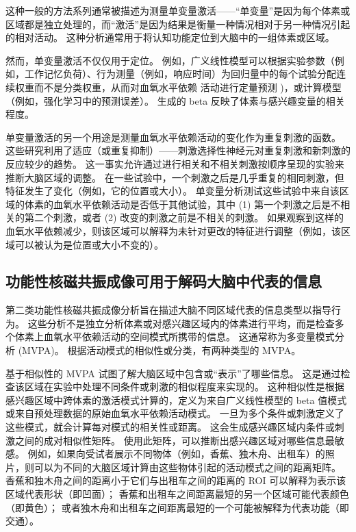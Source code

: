 这种一般的方法系列通常被描述为测量单变量激活——“单变量”是因为每个体素或区域都是独立处理的，而“激活”是因为结果是衡量一种情况相对于另一种情况引起的相对活动。
这种分析通常用于将认知功能定位到大脑中的一组体素或区域。


然而，单变量激活不仅仅用于定位。
例如，广义线性模型可以根据实验参数（例如，工作记忆负荷）、行为测量（例如，响应时间）为回归量中的每个试验分配连续权重而不是分类权重，从而对血氧水平依赖 活动进行定量预测 )，或计算模型（例如，强化学习中的预测误差）。
生成的 beta 反映了体素与感兴趣变量的相关程度。


单变量激活的另一个用途是测量血氧水平依赖活动的变化作为重复刺激的函数。
这些研究利用了适应（或重复抑制）——刺激选择性神经元对重复刺激和新刺激的反应较少的趋势。
这一事实允许通过进行相关和不相关刺激按顺序呈现的实验来推断大脑区域的调整。
在一些试验中，一个刺激之后是几乎重复的相同刺激，但特征发生了变化（例如，它的位置或大小）。
单变量分析测试这些试验中来自该区域的体素的血氧水平依赖活动是否低于其他试验，其中 (1) 第一个刺激之后是不相关的第二个刺激，或者 (2) 改变的刺激之前是不相关的刺激。
如果观察到这样的血氧水平依赖减少，则该区域可以解释为未针对更改的特征进行调整（例如，该区域可以被认为是位置或大小不变的）。



\subsection{功能性核磁共振成像可用于解码大脑中代表的信息}

第二类功能性核磁共振成像分析旨在描述大脑不同区域代表的信息类型以指导行为。 
这些分析不是独立分析体素或对感兴趣区域内的体素进行平均，而是检查多个体素上血氧水平依赖活动的空间模式所携带的信息。 
这通常称为多变量模式分析 (MVPA)。 
根据活动模式的相似性或分类，有两种类型的 MVPA。


基于相似性的 MVPA 试图了解大脑区域中包含或“表示”了哪些信息。 
这是通过检查该区域在实验中处理不同条件或刺激的相似程度来实现的。 
这种相似性是根据感兴趣区域中跨体素的激活模式计算的，定义为来自广义线性模型的 beta 值模式或来自预处理数据的原始血氧水平依赖活动模式。 
一旦为多个条件或刺激定义了这些模式，就会计算每对模式的相关性或距离。 
这会生成感兴趣区域内条件或刺激之间的成对相似性矩阵。 
使用此矩阵，可以推断出感兴趣区域对哪些信息最敏感。 
例如，如果向受试者展示不同物体（例如，香蕉、独木舟、出租车）的照片，则可以为不同的大脑区域计算由这些物体引起的活动模式之间的距离矩阵。
香蕉和独木舟之间的距离小于它们与出租车之间的距离的 ROI 可以解释为表示该区域代表形状（即凹面）；
香蕉和出租车之间距离最短的另一个区域可能代表颜色（即黄色）；
或者独木舟和出租车之间距离最短的一个可能被解释为代表功能（即交通）。


